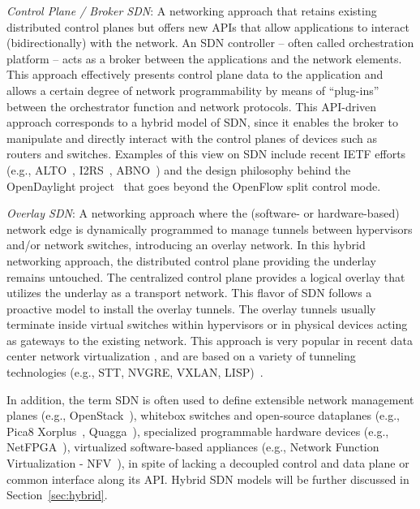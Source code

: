 \noindent \textit{Control Plane / Broker SDN}: A networking approach that retains existing distributed 
control planes but offers new APIs that allow applications to interact (bidirectionally) with the network. 
An SDN controller -- often called orchestration platform -- acts as a broker between the applications and 
the network elements. This approach effectively presents control plane data to the application and allows 
a certain degree of network programmability by means of ``plug-ins'' between the orchestrator function and 
network protocols. This API-driven approach corresponds to a hybrid model of SDN, since it enables the broker 
to manipulate and directly interact with the control planes of devices such as routers and switches. Examples 
of this view on SDN include recent IETF efforts (e.g., ALTO~\cite{alimi2013}, I2RS~\cite{ietfi2rsworkinggroup2014}, ABNO~\cite{king2014}) and the design philosophy behind the OpenDaylight project~\cite{opendaylight2013} that goes beyond the OpenFlow split control mode.

\noindent \textit{Overlay SDN}: A networking approach where the (software- or hardware-based) network edge 
is dynamically programmed to manage tunnels between hypervisors and/or network switches, introducing an 
overlay network. In this hybrid networking approach, the distributed control plane providing the underlay 
remains untouched. The centralized control plane provides a logical overlay that utilizes the underlay 
as a transport network. This flavor of SDN follows a proactive model to install the overlay tunnels. The overlay
tunnels usually terminate inside virtual switches within hypervisors or in physical devices acting as gateways 
to the existing network. This approach is very popular in recent data center network virtualization \cite{chowdhury2010}, and are based on a variety of tunneling technologies (e.g., STT, NVGRE, VXLAN,
LISP)~\cite{jain2013}.


In addition, the term SDN is often used to define extensible network management planes (e.g., OpenStack~\cite{corradi2014}), 
whitebox switches and open-source dataplanes (e.g., Pica8 Xorplus~\cite{shang2014}, Quagga~\cite{jakma2014}), specialized programmable hardware devices (e.g., 
NetFPGA~\cite{netfpga2014}), virtualized software-based appliances (e.g., Network Function Virtualization - NFV~\cite{martins2014}), in spite of 
lacking a decoupled control and data plane or common interface along its API. Hybrid SDN models will be further discussed in Section~\ref{sec:hybrid}. 

